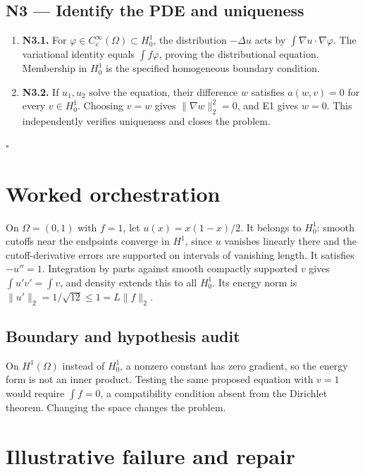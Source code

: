 \documentclass[preprint,12pt,aps,pra,showkeys,amsmath,amssymb,superscriptaddress,floatfix]{revtex4-2}
\theoremstyle{definition}
\theoremstyle{remark}
\begin{document}
\subsection{N3 --- Identify the PDE and
uniqueness}\label{n3-identify-the-pde-and-uniqueness}

\begin{enumerate}
\def\labelenumi{\arabic{enumi}.}
\item
  \textbf{N3.1.} For \(\varphi\in C_c^\infty(\Omega)\subset H_0^1\), the
  distribution \(-\Delta u\) acts by \(\int\nabla u\cdot\nabla\varphi\).
  The variational identity equals \(\int f\varphi\), proving the
  distributional equation. Membership in \(H_0^1\) is the specified
  homogeneous boundary condition.
\item
  \textbf{N3.2.} If \(u_1,u_2\) solve the equation, their difference
  \(w\) satisfies \(a(w,v)=0\) for every \(v\in H_0^1\). Choosing
  \(v=w\) gives \(\|\nabla w\|_2^2=0\), and E1 gives \(w=0\). This
  independently verifies uniqueness and closes the problem.
\end{enumerate}

\hfill$\square$

\section{Worked orchestration}

On \(\Omega=(0,1)\) with \(f=1\), let \(u(x)=x(1-x)/2\). It belongs to
\(H_0^1\): smooth cutoffs near the endpoints converge in \(H^1\), since
\(u\) vanishes linearly there and the cutoff-derivative errors are
supported on intervals of vanishing length. It satisfies \(-u''=1\).
Integration by parts against smooth compactly supported \(v\) gives
\(\int u'v'=\int v\), and density extends this to all \(H_0^1\). Its
energy norm is \(\|u'\|_2=1/\sqrt{12}\le1=L\|f\|_2\).

\subsection{Boundary and hypothesis audit}

On \(H^1(\Omega)\) instead of \(H_0^1\), a nonzero constant has zero
gradient, so the energy form is not an inner product. Testing the same
proposed equation with \(v=1\) would require \(\int f=0\), a
compatibility condition absent from the Dirichlet theorem. Changing the
space changes the problem.

\section{Illustrative failure and repair}
\end{document}
